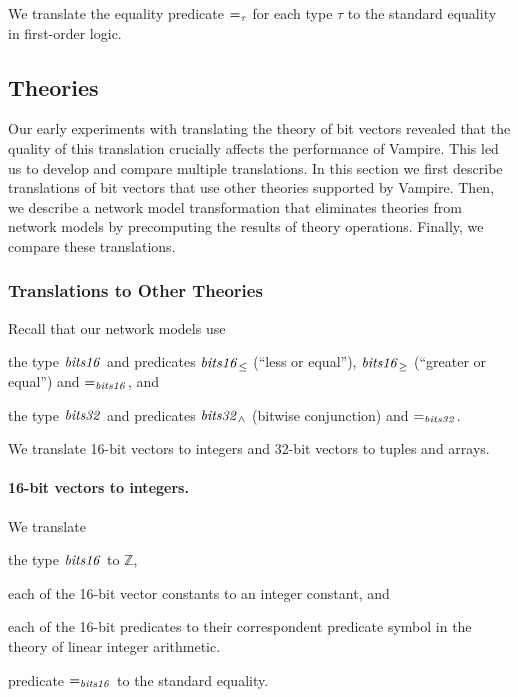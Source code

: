 We translate the equality predicate $\mathit{=}_\tau$ for each type $\tau$ to the standard equality in first-order logic. %

\subsection{Theories}
\label{sect:aws/fol/theories}
Our early experiments with translating the theory of bit vectors revealed that the quality of this translation crucially affects the performance of Vampire. This led us to develop and compare multiple translations. In this section we first describe translations of bit vectors that use other theories supported by Vampire. Then, we describe a network model transformation that eliminates theories from network models by precomputing the results of theory operations. Finally, we compare these translations.

\subsubsection*{Translations to Other Theories}
Recall that our network models use
\begin{enumerate*}[label=(\roman*)]
  \item the type $\mathit{bits16}$ and predicates $\mathit{bits16}_{\le}$ (``less or equal''), $\mathit{bits16}_{\ge}$ (``greater or equal'') and $\mathit{=}_{\mathit{bits16}}$, and
  \item the type $\mathit{bits32}$ and predicates $\mathit{bits32}_\wedge$ (bitwise conjunction) and $\mathit{=}_{\mathit{bits32}}$.
\end{enumerate*}
We translate 16-bit vectors to integers and 32-bit vectors to tuples and arrays.

\paragraph{16-bit vectors to integers.}
We translate
\begin{enumerate*}[label=(\roman*)]
  \item the type $\mathit{bits16}$ to $\mathbb{Z}$,
  \item each of the 16-bit vector constants to an integer constant, and
  \item each of the 16-bit predicates to their correspondent predicate symbol in the theory of linear integer arithmetic.
  \item predicate $\mathit{=}_{\mathit{bits16}}$ to the standard equality.
\end{enumerate*}

